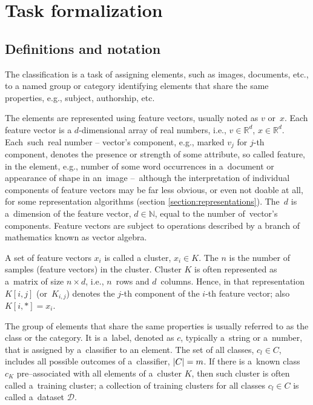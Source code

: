 \section{Task formalization}
\label{section:formalization}


\subsection{Definitions and notation}
\label{section:notation}

The classification is a task of assigning elements, such as images, documents, etc., to a named group or category identifying elements that share the same properties, e.g., subject, authorship, etc.

The elements are represented using feature vectors, usually noted as $v$ or~$x$. Each feature vector is a $d$-dimensional array of real numbers, i.e., $v \in \mathbb{R}^d$, $x \in \mathbb{R}^d$. Each~such~real number – vector's component, e.g., marked $v_j$ for $j$-th component, denotes the presence or strength of some attribute, so called feature, in the element, e.g., number of some word occurrences in a~document or appearance of shape in an~image –~although the interpretation of individual components of feature vectors may be far less obvious, or even not doable at all, for some representation algorithms (section \ref{section:representations}). The~$d$ is a~dimension of the feature vector, $d \in \mathbb{N}$, equal to the number of~vector's components. Feature vectors are subject to operations described by a branch of mathematics known as vector algebra.

A set of feature vectors $x_i$ is called a cluster, $x_i \in K$. The $n$ is the number of samples (feature vectors) in the cluster. Cluster $K$ is often represented as a~matrix of size $n \times d$, i.e., $n$~rows and $d$~columns. Hence, in that representation $K[i, j]$ (or~$K_{i,j}$) denotes the $j$-th component of the $i$-th feature vector; also $K[i,*] = x_i$.

The group of elements that share the same properties is usually referred to as the class or the category. It is a~label, denoted as $c$, typically a~string or a~number, that is assigned by a~classifier to an element. The set of all classes, $c_l \in C$, includes all possible outcomes of a~classifier, $\abs{C} = m$. If there is a~known class $c_K$ pre–associated with all elements of a~cluster $K$, then such cluster is often called a~training cluster; a collection of training clusters for all classes $c_l \in C$ is called a~dataset $\mathcal{D}$.

